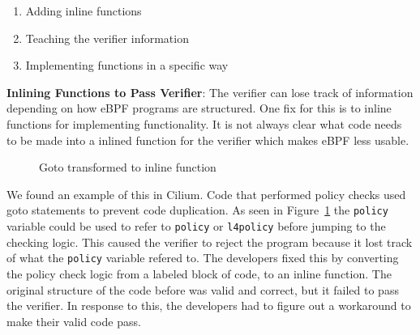 \begin{enumerate}
    \item Adding inline functions
    \item Teaching the verifier information
    \item Implementing functions in a specific way
\end{enumerate}

\noindent\textbf{Inlining Functions to Pass Verifier}:
The verifier can lose track of information depending on how eBPF programs are structured.
One fix for this is to inline functions for implementing functionality.
It is not always clear what code needs to be made into a inlined function for the verifier
    which makes eBPF less usable.

\begin{figure}
    
    \caption{Goto transformed to inline function}
    \label{fig:inline-fig}
\end{figure}

%
%

We found an example of this in Cilium.
Code that performed policy checks used goto statements to prevent code duplication.
As seen in Figure~\ref{fig:inline-fig} the \texttt{policy} variable could be used to refer to \texttt{policy} or \texttt{l4policy} before jumping to the checking logic.
This caused the verifier to reject the program because it lost track of what the \texttt{policy} variable refered to.
The developers fixed this by converting the policy check logic from a labeled block of code, to an inline function.
The original structure of the code before was valid and correct, but it failed to pass the verifier.
In response to this, the developers had to figure out a workaround to make their valid code pass.


